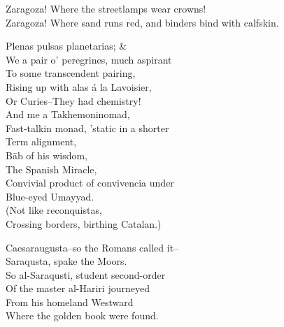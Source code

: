 Zaragoza! Where the streetlamps wear crowns! \\
Zaragoza! Where sand runs red, and binders bind with calfskin. 

Plenas pulsas planetarias; & \\
We a pair o' peregrines, much aspirant \\
To some transcendent pairing, \\
Rising up with alas á la Lavoisier, \\
Or Curies--They had chemistry! \\

And me a Takhemoninomad, \\
\quad Fast-talkin monad, 'static in a shorter \\
\qquad Term alignment, \\
Bāb of his wisdom, \\
\quad The Spanish Miracle, \\
\qquad Convivial product of convivencia under \\
Blue-eyed Umayyad. \\
(Not like reconquistas, \\
Crossing borders, birthing Catalan.)

Caesaraugusta--so the Romans called it-- \\
Saraqusta, spake the Moors. \\
So al-Saraqusti, student second-order \\
Of the master al-Hariri journeyed \\
From his homeland Westward \\
Where the golden book were found.